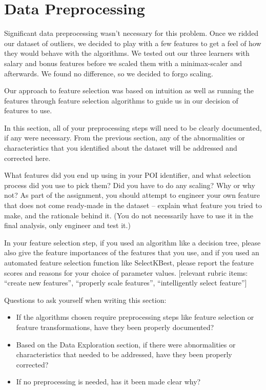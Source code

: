 \documentclass[twoside,openright,titlepage,numbers=noenddot,headinclude,%
               footinclude=true,cleardoublepage=empty,abstractoff,BCOR=5mm,%
               paper=a4,fontsize=11pt,ngerman,american]{scrreprt}
\numberwithin{theorem}{chapter}
\numberwithin{definition}{chapter}
\numberwithin{algorithm}{chapter}
\numberwithin{figure}{chapter}
\numberwithin{table}{chapter}
\numberwithin{equation}{chapter}
\begin{document}
\section*{Data Preprocessing}
Significant data preprocessing wasn't necessary for this problem. Once we ridded our dataset of outliers, we decided to play with a few features to get a feel of how they would behave with the algorithms. We tested out our three learners with salary and bonus features before we scaled them with a minimax-scaler and afterwards. We found no difference, so we decided to forgo scaling.

Our approach to feature selection was based on intuition as well as running the features through feature selection algorithms to guide us in our decision of features to use.

In this section, all of your preprocessing steps will need to be clearly documented, if any were necessary. From the previous section, any of the abnormalities or characteristics that you identified about the dataset will be addressed and corrected here. 

What features did you end up using in your POI identifier, and what selection process did you use to pick them? Did you have to do any scaling? Why or why not? As part of the assignment, you should attempt to engineer your own feature that does not come ready-made in the dataset -- explain what feature you tried to make, and the rationale behind it. (You do not necessarily have to use it in the final analysis, only engineer and test it.) 

In your feature selection step, if you used an algorithm like a decision tree, please also give the feature importances of the features that you use, and if you used an automated feature selection function like SelectKBest, please report the feature scores and reasons for your choice of parameter values.  [relevant rubric items: ``create new features'', ``properly scale features'', ``intelligently select feature'']

Questions to ask yourself when writing this section:
\begin{itemize}%
\item If the algorithms chosen require preprocessing steps like feature selection or feature transformations, have they been properly documented?
\item Based on the Data Exploration section, if there were abnormalities or characteristics that needed to be addressed, have they been properly corrected?
\item If no preprocessing is needed, has it been made clear why?
\end{itemize}
\end{document}
